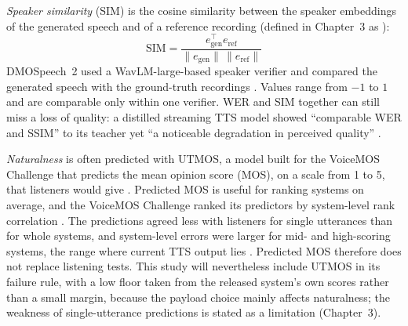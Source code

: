 \emph{Speaker similarity} (SIM) is the cosine similarity between the speaker embeddings of the generated speech and of a reference recording \parencite{chen2022wavlm,li2025dmospeech2} (defined in Chapter~3 as ):
\begin{equation}
\mathrm{SIM} = \frac{e_{\text{gen}}^{\top} e_{\text{ref}}}{\|e_{\text{gen}}\|\,\|e_{\text{ref}}\|}
\label{eq:rrl-sim}
\end{equation}
DMOSpeech~2 used a WavLM-large-based speaker verifier and compared the generated speech with the ground-truth recordings \parencite[p.~31819]{li2025dmospeech2}. Values range from $-1$ to $1$ and are comparable only within one verifier. WER and SIM together can still miss a loss of quality: a distilled streaming TTS model showed \enquote{comparable WER and SSIM} to its teacher yet \enquote{a noticeable degradation in perceived quality} \parencite[p.~4]{du2026streaming}.

\emph{Naturalness} is often predicted with UTMOS, a model built for the VoiceMOS Challenge that predicts the mean opinion score (MOS), on a scale from 1 to 5, that listeners would give \parencite{saeki2022utmos}. Predicted MOS is useful for ranking systems on average, and the VoiceMOS Challenge ranked its predictors by system-level rank correlation \parencite{huang2022voicemos}. The predictions agreed less with listeners for single utterances than for whole systems, and system-level errors were larger for mid- and high-scoring systems, the range where current TTS output lies \parencite{huang2022voicemos}. Predicted MOS therefore does not replace listening tests. This study will nevertheless include UTMOS in its failure rule, with a low floor taken from the released system's own scores rather than a small margin, because the payload choice mainly affects naturalness; the weakness of single-utterance predictions is stated as a limitation (Chapter~3).

